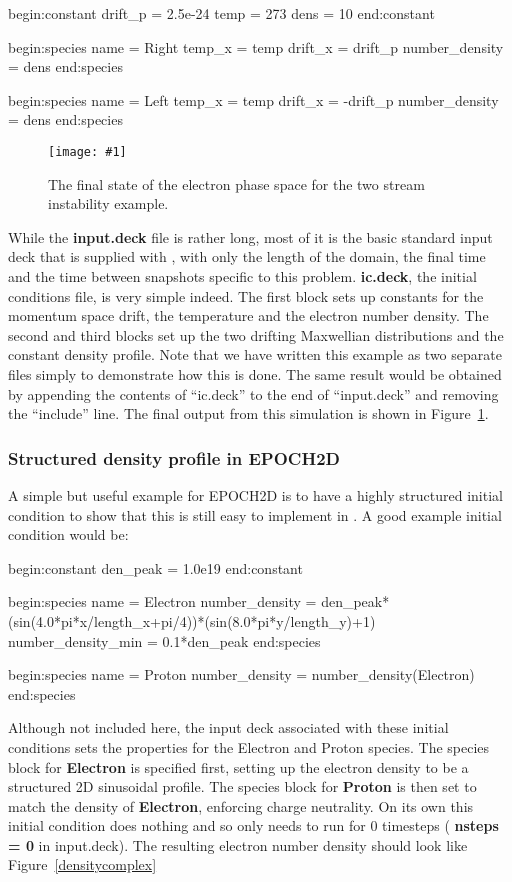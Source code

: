 \documentclass[12pt,a4paper]{article}
\newcommand{\inlineemph}[1]{{\color{warwicklight} \bf{#1}}}
\newcommand{\EPOCH}{{\color{warwickdark}\fontfamily{phv}\selectfont{EPOCH}}}
\newcommand{\scaledcapimage}[4]
  {{\begin{figure}[hbt!]\centering\texttt{[image: \#1]}\caption{#3}
    \label{#2} \end{figure}}}
\newenvironment{lboxverbatim}[1]{
\setlength{\FrameSep}{0pt}
\def\FrameCommand{\fboxsep=0pt \colorbox{shadecolor}}
\MakeFramed{\FrameRestore}
\vspace{-13.5pt}
\fvset{label=#1}
\boxverb
}{
\endboxverb
\vspace{-13.5pt}
\endMakeFramed
}
\begin{document}
\begin{lboxverbatim}{ic.deck}
begin:constant
   drift_p = 2.5e-24
   temp = 273
   dens = 10
end:constant

begin:species
   name = Right
   temp_x = temp
   drift_x = drift_p
   number_density = dens
end:species

begin:species
   name = Left
   temp_x = temp
   drift_x = -drift_p
   number_density = dens
end:species
\end{lboxverbatim}

\scaledcapimage{./images/late}{tsilate}{The final state of the electron
  phase space for the two stream instability example.}{0.4}

While the \inlineemph{input.deck} file is rather long, most of it is the basic
standard input deck that is supplied with {\EPOCH}, with only the length of the
domain, the final time and the time between snapshots specific to this
problem. \inlineemph{ic.deck}, the initial conditions file, is very simple
indeed. The first block sets up constants for the momentum space drift, the
temperature and the electron number density. The second and third blocks set up
the two drifting Maxwellian distributions and the constant density profile.
Note that we have written this example as two separate files simply
to demonstrate how this is done. The
same result would be obtained by appending the contents of ``ic.deck'' to
the end of ``input.deck'' and removing the ``include'' line.
The final output from this simulation is shown in Figure~\ref{tsilate}.

\subsubsection{Structured density profile in EPOCH2D}
A simple but useful example for EPOCH2D is to have a highly structured initial
condition to show that this is still easy to implement in {\EPOCH}. A good
example initial condition would be:
\begin{lboxverbatim}{ic.deck}
begin:constant
  den_peak = 1.0e19
end:constant

begin:species
  name = Electron
  number_density = den_peak*(sin(4.0*pi*x/length_x+pi/4))*(sin(8.0*pi*y/length_y)+1)
  number_density_min = 0.1*den_peak
end:species

begin:species
  name = Proton
  number_density = number_density(Electron)
end:species
\end{lboxverbatim}

Although not included here, the input deck associated with these initial
conditions sets the properties for the Electron and Proton species.
The species block for \inlineemph{Electron} is specified
first, setting up the electron density to be a structured 2D sinusoidal
profile. The species block for \inlineemph{Proton} is then set to
match the density of \inlineemph{Electron}, enforcing charge neutrality. On
its own this initial condition does nothing and so only needs to run for 0
timesteps (\inlineemph{nsteps = 0} in input.deck). The resulting electron number
density should look like Figure~\ref{densitycomplex}
\end{document}
